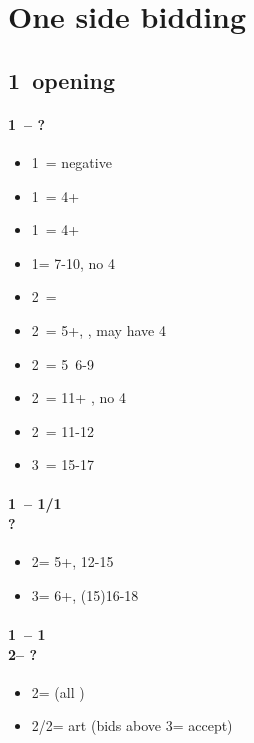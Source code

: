 \chapter{One side bidding}\label{chap:oneside}
\section{\texorpdfstring{1\clubs\ opening}{1cOpening}}\label{sec:1cOpening}

\subsubsection*{1\clubs\ -- ?}
\begin{itemize}
    \item 1\diams\ = negative
    \item 1\hearts\ = 4+\hearts
    \item 1\spades\ = 4+\spades
    \item 1\nt = 7-10, no 4\major
    \item 2\clubs\ = \gf
    \item 2\diams\ = 5+\diams, \gf, may have 4\major
    \item 2\hearts\ = 5\hearts\ 6-9
    \item 2\spades\ = 11+ \bal, no 4\major
    \item 2\ntx\ = 11-12 \bal
    \item 3\nt\ = 15-17 \bal
\end{itemize}

\subsubsection*{1\clubs\ -- 1\hearts/1\spades \\ ?}
\begin{itemize}
    \item 2\clubs = 5+\clubs, 12-15 \unbal
    \item 3\clubs = 6+\clubs, (15)16-18 \unbal
\end{itemize}

\subsubsection*{1\clubs\ -- 1\hearts \\ 
                2\clubs -- ?}
\begin{itemize}
    \item 2\diams = \gf (\then all \nat)
    \item 2\spades/2\nt = \inv art (bids above 3\clubs = accept)
\end{itemize}


